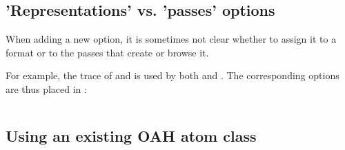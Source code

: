 \subsection{'Representations' vs. 'passes' options}

When adding a new option, it is sometimes not clear whether to assign it to a format or to the passes that create or browse it.

For example, the trace of  and  is used by both  and . The corresponding options are thus placed in :
\begin{lstlisting}[language=CPlusPlus]

\end{lstlisting}


\subsection{Using an existing OAH atom class}

